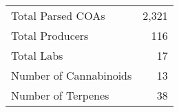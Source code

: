 \begin{tabular}{lr}
\toprule
Total Parsed COAs & 2,321 \\
Total Producers & 116 \\
Total Labs & 17 \\
Number of Cannabinoids & 13 \\
Number of Terpenes & 38 \\
\bottomrule
\end{tabular}
